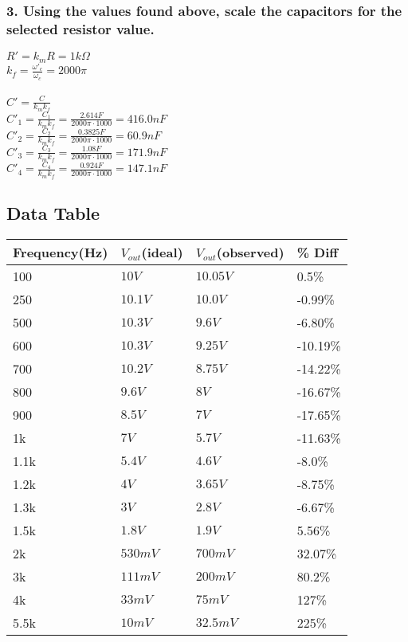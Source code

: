 \documentclass[11pt]{article}
\begin{document}
	\subsubsection*{3. Using the values found above, scale the capacitors for the selected resistor value.}
	
	$R'=k_{m}R=1k\Omega$\\
	$k_{f}= \frac{\omega'_{c}}{\omega_{c}}=2000\pi$\\\\
	$C'=\frac{C}{k_{m}k_{f}}$\\
	$C'_{1}=\frac{C_{1}}{k_{m}k_{f}}=\frac{2.614F}{2000\pi\cdot1000}=416.0nF$\\
	$C'_{2}=\frac{C_{2}}{k_{m}k_{f}}=\frac{0.3825F}{2000\pi\cdot1000}=60.9nF$\\	
	$C'_{3}=\frac{C_{3}}{k_{m}k_{f}}=\frac{1.08F}{2000\pi\cdot1000}=171.9nF$\\ 
	$C'_{4}=\frac{C_{4}}{k_{m}k_{f}}=\frac{0.924F}{2000\pi\cdot1000}=147.1nF$\\ 
	\subsection*{Data Table}
		\begin{table}[H]
		\def\arraystretch{1.2}%
		\centering
		\begin{tabular}{|l|l|l|l|}
			\hline
			Frequency(Hz)		& $V_{out}$(ideal)		&  $V_{out}$(observed) 			&\% Diff	\\ \hline
			100  				& $10V$						& $10.05V$        			&0.5\%		\\ \hline	
			250					& $10.1V $					& $10.0V $    				&-0.99\%	\\ \hline
			500					& $10.3V$					& $9.6V$					&-6.80\%	\\ \hline
			600					& $10.3V$					& $9.25V$					&-10.19\%	\\ \hline
			700					& $10.2V$					& $8.75V$					&-14.22\%	\\ \hline
			800					& $9.6V$					& $8V$						&-16.67\%	\\ \hline
			900					& $8.5V$					& $7V$						&-17.65\%	\\ \hline
			1k					& $7V$						& $5.7V$					&-11.63\%	\\ \hline
			1.1k				& $5.4V$					& $4.6V$					&-8.0\%		\\ \hline
			1.2k				& $4V$						& $3.65V$					&-8.75\%	\\ \hline
			1.3k				& $3V$						& $2.8V$					&-6.67\%	\\ \hline
			1.5k				& $1.8V$					& $1.9V$					&5.56\%		\\ \hline
			2k					& $530mV$					& $700mV$					&32.07\%	\\ \hline
			3k					& $111mV$					& $200mV$					&80.2\%		\\ \hline
			4k					& $33mV$					& $75mV$					&127\%		\\ \hline
			5.5k				& $10mV$					& $32.5mV$					&225\%		\\ \hline
			
			
			
			
			
	\end{tabular}
	\end{table}
\end{document}
